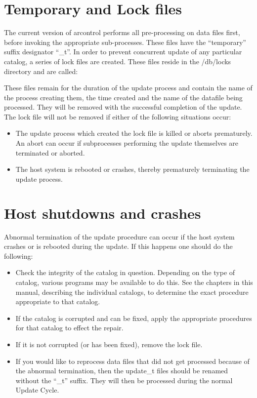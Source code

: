 %
%
%

\section{Temporary and Lock files}

The current version of arcontrol performs all pre-processing on data files
first, before invoking the appropriate sub-processes. These files have the
``temporary'' suffix designator ``\_t''. In order to prevent concurrent update of
any particular catalog, a series of lock files are created. These files reside
in the \archie/db/locks directory and are called:


These files remain for the duration of the update process and contain the name
of the process creating them, the time created and the name of the datafile
being processed. They will be removed with the successful completion of the
update. The lock file will not be removed if either of the following
situations occur:

\begin{itemize}
\item
The update process which created the lock file is killed or aborts prematurely. An abort can occur if subprocesses performing the update themselves are terminated or aborted.

\item
The host system is rebooted or crashes, thereby prematurely terminating the update process.
\end{itemize}


%
%
%

\section{Host shutdowns and crashes}

Abnormal termination of the update procedure can occur if the host system crashes or is rebooted during the update. If this happens one should do the following:

\begin{itemize}
\item Check the integrity of the catalog in question. Depending on the type of catalog, various programs may be available to do this. See the chapters in this manual, describing the individual catalogs, to determine the exact procedure appropriate to that catalog.

\item If the catalog is corrupted and can be fixed, apply the appropriate
procedures for that catalog to effect the repair.

\item If it is not corrupted (or has been fixed), remove the lock file.

\item If you would like to reprocess data files that did not get processed because of the abnormal termination, then the update\_t files should be renamed without the ``\_t'' suffix. They will then be processed during the normal Update Cycle.
\end{itemize}


